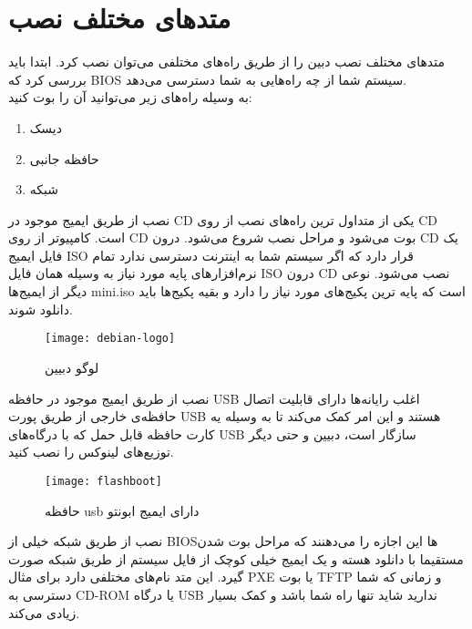 \section{متدهای مختلف نصب}
\begin{frame}{متدهای مختلف نصب}
  دبین را از طریق راه‌های مختلفی می‌توان نصب کرد. ابتدا باید بررسی کرد که BIOS سیستم شما از چه راه‌هایی به شما دسترسی می‌دهد.\\
  به وسیله راه‌های زیر می‌توانید آن را بوت کنید:
  \begin{enumerate}
    \item دیسک
    \item حافظه جانبی
    \item شبکه
  \end{enumerate}
\end{frame}
\begin{frame}{نصب از طریق ایمیج موجود در CD}
  یکی از متداول ترین راه‌های نصب از روی CD است.
  کامپیوتر از روی CD بوت می‌شود و مراحل نصب شروع می‌شود. درون CD یک فایل ایمیج ISO قرار دارد که اگر سیستم شما به اینترنت دسترسی ندارد تمام نرم‌افزارهای پایه مورد نیاز به وسیله همان فایل ISO درون CD نصب می‌شود.
  نوعی دیگر از ایمیج‌ها mini.iso  است که پایه ترین پکیج‌های مورد نیاز را دارد و بقیه پکیج‌ها باید دانلود شوند.
  \begin{figure}
    \centering
    \texttt{[image: debian-logo]}
    \caption{لوگو دبیین~\cite{fig:wp:deb_live}}
  \end{figure}
\end{frame}
\begin{frame}{نصب از طریق ایمیج موجود در حافظه USB}
  اغلب رایانه‌ها دارای قابلیت اتصال حافظه‌ی خارجی از طریق پورت USB هستند و این امر کمک می‌کند تا به وسیله یه کارت حافظه قابل حمل که با درگاه‌های USB سازگار است، دبیین و حتی دیگر توزیع‌های لینوکس را نصب کنید.
  \begin{figure}
    \centering
    \texttt{[image: flashboot]}
    \caption{حافظه usb دارای ایمیج ابونتو~\cite{fig:usb_bootable}}
  \end{figure}
\end{frame}
\begin{frame}{نصب از طریق شبکه}
  خیلی از BIOS‌ها این اجازه را می‌دهنند که مراحل بوت شدن مستقیما با دانلود هسته و یک ایمیج خیلی کوچک از فایل سیستم‌ از طریق شبکه صورت گیرد.
  این متد نام‌های مختلفی دارد برای مثال PXE یا بوت TFTP و زمانی که شما دسترسی به CD-ROM یا درگاه USB ندارید شاید تنها راه شما باشد و کمک بسیار زیادی می‌کند.\\
\end{frame}

